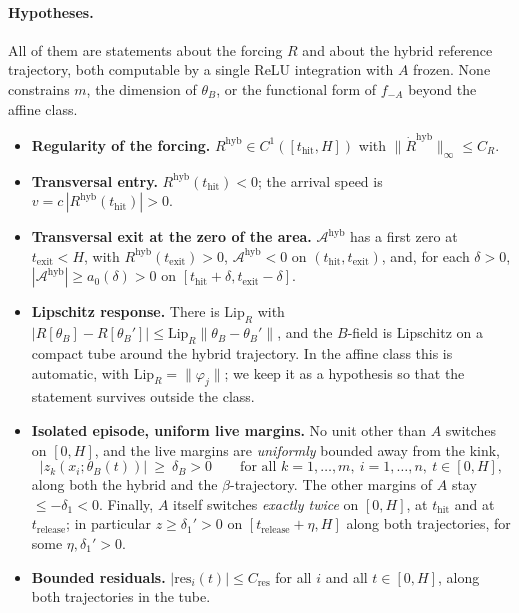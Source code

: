 \documentclass[11pt]{article}
\makeatletter
\theoremstyle{definition}
\theoremstyle{remark}
\newcommand{\thit}{t_{\mathrm{hit}}}
\newcommand{\texit}{t_{\mathrm{exit}}}
\newcommand{\trel}{t_{\mathrm{release}}}
\newcommand{\Ar}{\mathcal{A}}                      %
\newcommand{\hyb}{\mathrm{hyb}}
\newcommand{\res}{\mathrm{res}}
\newcommand{\hyplabel}[2]{%
  \phantomsection
  \protected@edef\@currentlabel{#1}\label{#2}}
\makeatother
\begin{document}
\paragraph{Hypotheses.} All of them are statements about the forcing $R$ and
about the hybrid reference trajectory, both computable by a single ReLU
integration with $A$ frozen. None constrains $m$, the dimension of $\theta_B$,
or the functional form of $f_{-A}$ beyond the affine class.

\begin{itemize}
\item[(H0$'$)\hyplabel{H0$'$}{H0p}] \textbf{Regularity of the forcing.}
$R^{\hyb}\in C^1([\thit,H])$ with $\|\dot R^{\hyb}\|_\infty\le C_R$.
\item[(H1$'$)\hyplabel{H1$'$}{H1p}] \textbf{Transversal entry.} $R^{\hyb}(\thit)<0$; the arrival
speed is $v=c\,|R^{\hyb}(\thit)|>0$.
\item[(H2$'$)\hyplabel{H2$'$}{H2p}] \textbf{Transversal exit at the zero of the area.} $\Ar^{\hyb}$
has a first zero at $\texit<H$, with $R^{\hyb}(\texit)>0$, $\Ar^{\hyb}<0$ on
$(\thit,\texit)$, and, for each $\delta>0$, $|\Ar^{\hyb}|\ge a_0(\delta)>0$ on
$[\thit+\delta,\texit-\delta]$.
\item[(H3$'$)\hyplabel{H3$'$}{H3p}] \textbf{Lipschitz response.} There is $\mathrm{Lip}_R$ with
$|R[\theta_B]-R[\theta_B']|\le\mathrm{Lip}_R\|\theta_B-\theta_B'\|$, and the
$B$-field is Lipschitz on a compact tube around the hybrid trajectory. In the
affine class this is automatic, with $\mathrm{Lip}_R=\|\varphi_j\|$; we keep it
as a hypothesis so that the statement survives outside the class.
\item[(H4$'$)\hyplabel{H4$'$}{H4p}] \textbf{Isolated episode, uniform live margins.} No unit other
than $A$ switches on $[0,H]$, and the live margins are \emph{uniformly} bounded
away from the kink,
\[
\bigl|z_k(x_i;\theta_B(t))\bigr|\ \ge\ \delta_B>0
\qquad\text{for all }k=1,\dots,m,\ i=1,\dots,n,\ t\in[0,H],
\]
along both the hybrid and the $\beta$-trajectory. The other margins of $A$ stay
$\le-\delta_1<0$. Finally, $A$ itself switches \emph{exactly twice} on $[0,H]$,
at $\thit$ and at $\trel$; in particular $z\ge\delta_1'>0$ on $[\trel+\eta,H]$
along both trajectories, for some $\eta,\delta_1'>0$.
\item[(H5$'$)\hyplabel{H5$'$}{H5p}] \textbf{Bounded residuals.} $|\res_i(t)|\le C_{\mathrm{res}}$ for
all $i$ and all $t\in[0,H]$, along both trajectories in the tube.
\end{itemize}
\end{document}
